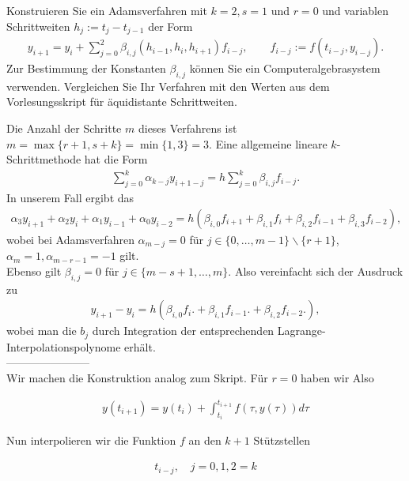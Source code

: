 \begin{exercise}
Konstruieren Sie ein Adamsverfahren mit $k = 2, s = 1$ und $r = 0$ und variablen
Schrittweiten $h_j := t_j - t_{j-1}$ der Form
\begin{align}
  y_{i+1} = y_i + \sum_{j=0}^2 \beta_{i,j}(h_{i-1},h_i,h_{i+1})f_{i-j},
  \qquad f_{i-j} := f(t_{i-j},y_{i-j}).
\end{align}
Zur Bestimmung der Konstanten $\beta_{i,j}$ können Sie ein Computeralgebrasystem
verwenden. Vergleichen Sie Ihr Verfahren mit den Werten aus dem Vorlesungsskript
für äquidistante Schrittweiten.
\end{exercise}
\begin{solution}
Die Anzahl der Schritte $m$ dieses Verfahrens ist $m = \max\{r+1,s+k\}=\min\{1,3\} = 3$.
Eine allgemeine lineare $k$-Schrittmethode hat die Form
\begin{align*}
  \sum_{j = 0}^k \alpha_{k - j}y_{i+1-j} = h \sum_{j = 0}^k \beta_{i,j}f_{i-j}.
\end{align*}
In unserem Fall ergibt das
\begin{align*}
  \alpha_3 y_{i + 1} + \alpha_2 y_{i} + \alpha_1 y_{i - 1} + \alpha_0 y_{i - 2} =
  h \left(\beta_{i,0} f_{i+1} +
  \beta_{i,1} f_{i} +
  \beta_{i,2} f_{i-1} +
  \beta_{i,3} f_{i-2}\right),
\end{align*}
wobei bei Adamsverfahren $\alpha_{m-j} = 0$ für $j \in \{0,\dots,m-1\}\backslash\{r+1\}$,
$\alpha_m = 1, \alpha_{m-r-1} = -1$ gilt. \\
Ebenso gilt $\beta_{i,j} = 0$ für $j \in \{m-s+1,\dots,m\}$.
Also vereinfacht sich der Ausdruck zu
\begin{align*}
y_{i + 1} - y_{i} =
h \left(
\beta_{i,0} f_{i}. +
\beta_{i,1} f_{i-1}. +
\beta_{i,2} f_{i-2}.\right),
\end{align*}
wobei man die $b_j$ durch Integration der entsprechenden Lagrange-Interpolationspolynome erhält. \\

----------------------- \\

Wir machen die Konstruktion analog zum Skript. Für $r=0$ haben wir Also

\begin{align*}
  y(t_{i+1}) = y(t_i) + \int_{t_i}^{t_{i+1}} f(\tau, y(\tau))d\tau
\end{align*}

Nun interpolieren wir die Funktion $f$ an den $k+1$ Stützstellen

\begin{align*}
  t_{i-j}, \quad j=0,1,2 = k
\end{align*}


\end{solution}
